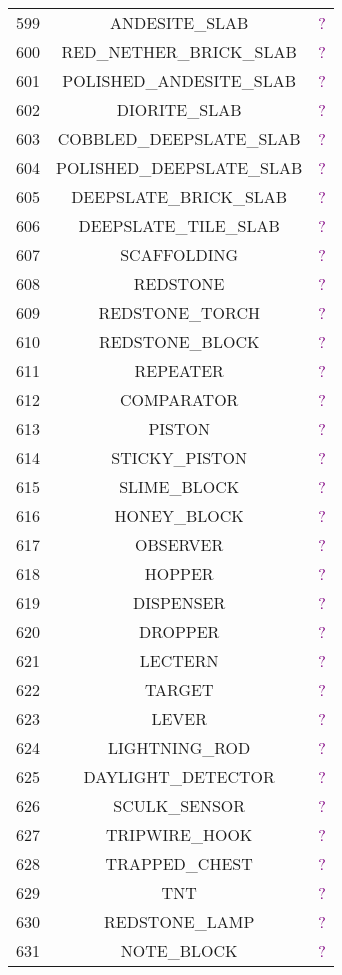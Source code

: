 \documentclass[11pt]{article}
\newcommand\myworries[1]{\textcolor{purple}{#1}}
\begin{document}
\begin{longtable}{ |c|c|c| }
	599 & ANDESITE\_SLAB & \myworries{?} \\
	600 & RED\_NETHER\_BRICK\_SLAB & \myworries{?} \\
	601 & POLISHED\_ANDESITE\_SLAB & \myworries{?} \\
	602 & DIORITE\_SLAB & \myworries{?} \\
	603 & COBBLED\_DEEPSLATE\_SLAB & \myworries{?} \\
	604 & POLISHED\_DEEPSLATE\_SLAB & \myworries{?} \\
	605 & DEEPSLATE\_BRICK\_SLAB & \myworries{?} \\
	606 & DEEPSLATE\_TILE\_SLAB & \myworries{?} \\
	607 & SCAFFOLDING & \myworries{?} \\
	608 & REDSTONE & \myworries{?} \\
	609 & REDSTONE\_TORCH & \myworries{?} \\
	610 & REDSTONE\_BLOCK & \myworries{?} \\
	611 & REPEATER & \myworries{?} \\
	612 & COMPARATOR & \myworries{?} \\
	613 & PISTON & \myworries{?} \\
	614 & STICKY\_PISTON & \myworries{?} \\
	615 & SLIME\_BLOCK & \myworries{?} \\
	616 & HONEY\_BLOCK & \myworries{?} \\
	617 & OBSERVER & \myworries{?} \\
	618 & HOPPER & \myworries{?} \\
	619 & DISPENSER & \myworries{?} \\
	620 & DROPPER & \myworries{?} \\
	621 & LECTERN & \myworries{?} \\
	622 & TARGET & \myworries{?} \\
	623 & LEVER & \myworries{?} \\
	624 & LIGHTNING\_ROD & \myworries{?} \\
	625 & DAYLIGHT\_DETECTOR & \myworries{?} \\
	626 & SCULK\_SENSOR & \myworries{?} \\
	627 & TRIPWIRE\_HOOK & \myworries{?} \\
	628 & TRAPPED\_CHEST & \myworries{?} \\
	629 & TNT & \myworries{?} \\
	630 & REDSTONE\_LAMP & \myworries{?} \\
	631 & NOTE\_BLOCK & \myworries{?} \\

\end{longtable}
\end{document}
